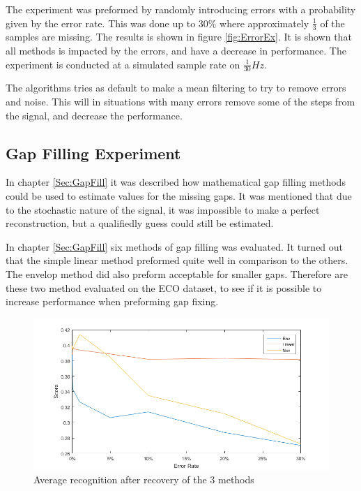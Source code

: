 The experiment was preformed by randomly introducing errors with a probability given by the error rate. This was done up to 30\% where approximately $\frac{1}{3}$ of the samples are missing. The results is shown in figure \ref{fig:ErrorEx}. It is shown that all methods is impacted by the errors, and have a decrease in performance. The experiment is conducted at a simulated sample rate on $\frac{1}{30} Hz$.

The algorithms tries as default to make a mean filtering to try to remove errors and noise. This will in situations with many errors remove some of the steps from the signal, and decrease the performance.  



\subsection{Gap Filling Experiment}
In chapter \ref{Sec:GapFill} it was described how mathematical gap filling methods could be used to estimate values for the missing gaps. It was mentioned that due to the stochastic nature of the signal, it was impossible to make a perfect reconstruction, but a qualifiedly guess could still be estimated.

In chapter \ref{Sec:GapFill} six methods of gap filling was evaluated. It turned out that the simple linear method preformed quite well in comparison to the others. The envelop method did also preform acceptable for smaller gaps. Therefore are these two method evaluated on the ECO dataset, to see if it is possible to increase performance when preforming gap fixing. 


\begin{figure}[H]
\centering
\includegraphics[width=1\textwidth]{billeder/EcoRecError.png}
\caption{Average recognition after recovery of the 3 methods}
\label{fig:GER}
\end{figure}


